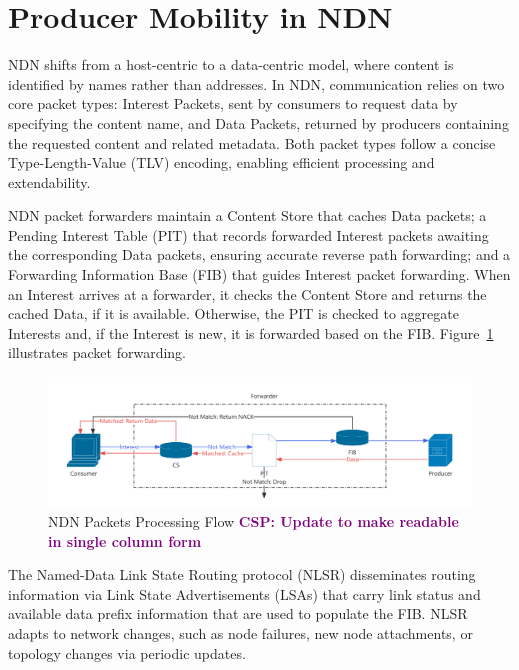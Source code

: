 \documentclass[10pt,conference]{IEEEtran}
\newcommand{\csp}[1]{\textbf{\textcolor{purple}{CSP: #1}}}
\begin{document}
\section{Producer Mobility in NDN}
\label{sec:problem}

NDN shifts from a host-centric to a data-centric model, where content is identified by names rather than addresses. In NDN, communication relies on two core packet types: Interest Packets, sent by consumers to request data by specifying the content name, and Data Packets, returned by producers containing the requested content and related metadata. Both packet types follow a concise Type-Length-Value (TLV) encoding, enabling efficient processing and extendability.

NDN packet forwarders maintain a Content Store that caches Data packets; a Pending Interest Table (PIT) that records forwarded Interest packets awaiting the corresponding Data packets, ensuring accurate reverse path forwarding; and a Forwarding Information Base (FIB) that guides Interest packet forwarding.
When an Interest arrives at a forwarder, it checks the Content Store and returns the cached Data, if it is available. Otherwise, the PIT is checked to aggregate Interests and, if the Interest is new, it is forwarded based on the FIB. Figure~\ref{fig:NDN Packets Processing Flow} illustrates packet forwarding.

\begin{figure}[t]
    \centering
    \includegraphics[width=1\linewidth]{figures/NDN_Packets_Processing_Flow.pdf}
    \caption{NDN Packets Processing Flow \csp{Update to make readable in single column form}}
    \label{fig:NDN Packets Processing Flow}
\end{figure}

The Named-Data Link State Routing protocol (NLSR) disseminates routing information via Link State Advertisements (LSAs) that carry link status and available data prefix information that are used to populate the FIB. NLSR adapts to network changes, such as node failures, new node attachments, or topology changes via periodic updates.
\end{document}
